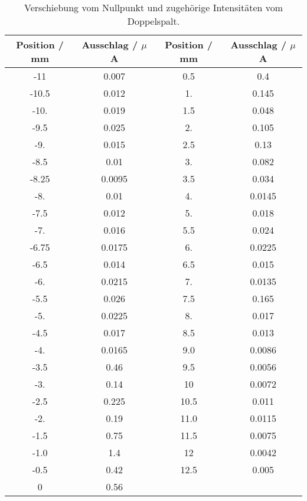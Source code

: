 \begin{table}[!htp]
\centering
\caption{Verschiebung vom Nullpunkt und zugehörige Intensitäten vom Doppelspalt.}
\label{tab:doppel}
\begin{tabular}{c c c c}
\toprule
{{Position / mm}} & {{Ausschlag / $\mu$ A}} & {{Position / mm}} & {{Ausschlag / $\mu$ A}} \\
\midrule
-11  &  0.007  &0.5  &  0.4    \\
-10.5&  0.012  &1.   &  0.145  \\
-10. &  0.019  &1.5  &  0.048  \\
-9.5 &  0.025  &2.   &  0.105  \\
-9.  &  0.015  &2.5  &  0.13   \\
-8.5 &  0.01   &3.   &  0.082  \\
-8.25&  0.0095 &3.5  &  0.034  \\
-8.  &  0.01   &4.   &  0.0145 \\
-7.5 &  0.012  &5.   &  0.018  \\
-7.  &  0.016  &5.5  &  0.024  \\
-6.75&  0.0175 &6.   &  0.0225 \\
-6.5 &  0.014  &6.5  &  0.015  \\
-6.  &  0.0215 &7.   &  0.0135 \\
-5.5 &  0.026  &7.5  &  0.165  \\
-5.  &  0.0225 &8.   &  0.017  \\
-4.5 &  0.017  &8.5  &  0.013  \\
-4.  &  0.0165 &9.0  &  0.0086 \\
-3.5 &  0.46   &9.5  &  0.0056 \\
-3.  &  0.14   &10   &  0.0072 \\
-2.5 &  0.225  &10.5 &  0.011  \\
-2.  &  0.19   &11.0 &  0.0115 \\
-1.5 &  0.75   &11.5 &  0.0075 \\
-1.0 &  1.4    &12   &  0.0042 \\
-0.5 &  0.42   &12.5 &  0.005  \\
0    &  0.56   &  & \\
\bottomrule
\end{tabular}
\end{table}